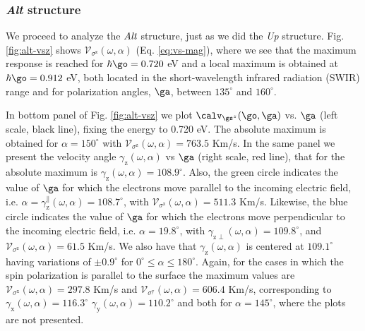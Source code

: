 \documentclass[prb,11pt,tightenlines,twocolumn,aps]{revtex4-1}
\begin{document}

\subsubsection{\emph{Alt} structure}

We proceed to analyze the $\emph{Alt}$ structure, just as we did the \emph{Up}
structure. Fig. \ref{fig:alt-vsz} shows $\mathcal{V}_{\sigma^{\mathrm{z}}}
(\omega,\alpha)$ (Eq. \eqref{eq:vs-mag}), where we see that the maximum
response is reached for $\hbar\go=0.720$ eV and a local maximum is obtained at
$\hbar\go=0.912$ eV, both located in the short-wavelength infrared radiation
(SWIR) range and for polarization angles, $\ga$,  between $135^{\circ}$ and
$160^{\circ}$.

In bottom panel of Fig. \ref{fig:alt-vsz} we plot $\calv_{\gs^z}(\go,\ga)$ vs.
$\ga$ (left scale, black line), fixing the energy to 0.720 eV. The absolute
maximum is obtained for $\alpha = 150^{\circ}$ with
$\mathcal{V}_{\sigma^{\mathrm{z}}} (\omega,\alpha) = 763.5$ Km/s.
% 
In the same panel we present the velocity angle
$\gamma_{\mathrm{z}}(\omega,\alpha)$ vs $\ga$ (right scale, red line), that for
the absolute maximum is $\gamma_{\mathrm{z}}(\omega,\alpha) = 108.9^{\circ}$.
% 
Also, the green circle indicates the value of $\ga$ for which the electrons
move parallel to the incoming electric field, i.e. $\alpha =
\gamma_{\mathrm{z}}^\parallel(\omega,\alpha) = 108.7^{\circ}$, with
$\mathcal{V}_{\sigma^{\mathrm{z}}}(\omega,\alpha) = 511.3$ Km/s. Likewise, the
blue circle indicates the value of $\ga$ for which the electrons move
perpendicular to the incoming electric field, i.e. $\alpha=19.8^{\circ}$, with
$\gamma_{\mathrm{z}\perp}(\omega,\alpha)=109.8^{\circ}$, and
$\mathcal{V}_{\sigma^{\mathrm{z}}} (\omega,\alpha)=61.5$ Km/s.
% 
We also have that $\gamma_{\mathrm{z}}(\omega,\alpha)$ is centered at
$109.1^{\circ}$ having variations of $\pm 0.9^{\circ}$ for $0^{\circ} \leq
\alpha \leq 180^{\circ}$.
% 
Again, for the cases in which the spin polarization is parallel to the surface
the maximum values are $\mathcal{V}_{\sigma^{\mathrm{x}}}(\omega,\alpha) =
297.8$ Km/s and $\mathcal{V}_{\sigma^{\mathrm{y}}}(\omega,\alpha) = 606.4$
Km/s, corresponding to $\gamma_{\mathrm{x}}(\omega,\alpha) = 116.3^{\circ}$
$\gamma_{\mathrm{y}}(\omega,\alpha) = 110.2^{\circ}$ and both for
$\alpha=145^{\circ}$, where the plots are not presented.
\end{document}
